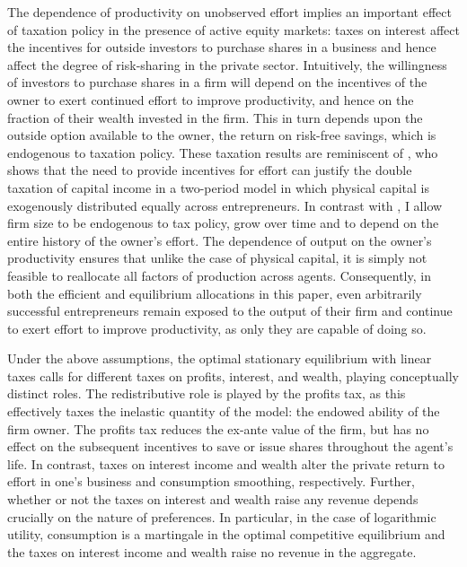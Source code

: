 \documentclass[11pt]{article}
\theoremstyle{plain}
\begin{document}
The dependence of productivity on unobserved effort implies an important effect of taxation policy in the presence of active equity markets: taxes on interest affect the incentives for outside investors to purchase shares in a business and hence affect the degree of risk-sharing in the private sector. Intuitively, the willingness of investors to purchase shares in a firm will depend on the incentives of the owner to exert continued effort to improve productivity, and hence on the fraction of their wealth invested in the firm. This in turn depends upon the outside option available to the owner, the return on risk-free savings, which is endogenous to taxation policy. These taxation results are reminiscent of \cite{albanesi_optimal_2006}, who shows that the need to provide incentives for effort can justify the double taxation of capital income in a two-period model in which physical capital is exogenously distributed equally across entrepreneurs. In contrast with \cite{albanesi_optimal_2006}, I allow firm size to be endogenous to tax policy, grow over time and to depend on the entire history of the owner's effort. The dependence of output on the owner's productivity ensures that unlike the case of physical capital, it is simply not feasible to reallocate all factors of production across agents. Consequently, in both the efficient and equilibrium allocations in this paper, even arbitrarily successful entrepreneurs remain exposed to the output of their firm and continue to exert effort to improve productivity, as only they are capable of doing so. 


Under the above assumptions, the optimal stationary equilibrium with linear taxes calls for different taxes on profits, interest, and wealth, playing conceptually distinct roles. The redistributive role is played by the profits tax, as this effectively taxes the inelastic quantity of the model: the endowed ability of the firm owner. The profits tax reduces the ex-ante value of the firm, but has no effect on the subsequent incentives to save or issue shares throughout the agent's life. In contrast, taxes on interest income and wealth alter the private return to effort in one's business and consumption smoothing, respectively. Further, whether or not the taxes on interest and wealth raise any revenue depends crucially on the nature of preferences. In particular, in the case of logarithmic utility, consumption is a martingale in the optimal competitive equilibrium and the taxes on interest income and wealth raise no revenue in the aggregate. 
\end{document}
